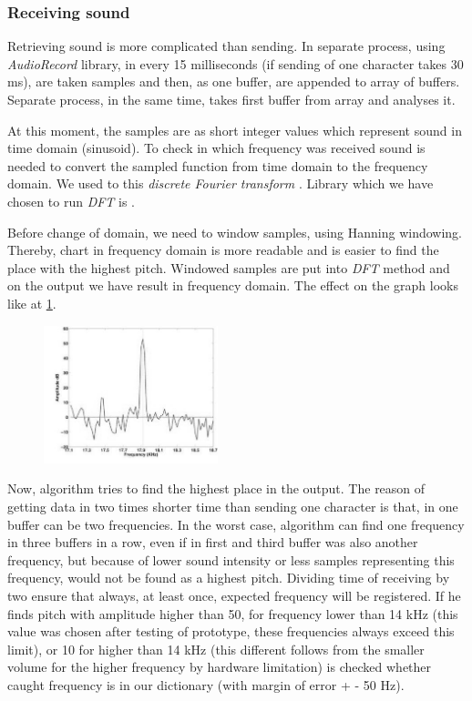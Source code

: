 \documentclass[11pt,titlepage]{article}
\theoremstyle{plain}
\begin{document}
\subsubsection{Receiving sound}

Retrieving sound is more complicated than sending. In separate process, using \textit{AudioRecord} library, in every 15 milliseconds (if sending of one character takes 30 ms), are taken samples and then, as one buffer, are appended to array of buffers. Separate process, in the same time, takes first buffer from array and analyses it. 

\vspace{5mm}

At this moment, the samples are as short integer values which represent sound in time domain (sinusoid). To check in which frequency was received sound is needed to convert the sampled function from time domain to the frequency domain. We used to this \textit{discrete Fourier transform }. Library which we have chosen to run \textit{DFT} is \cite{minim_dft}. 

\vspace{5mm}

Before change of domain, we need to window samples, using Hanning windowing. Thereby, chart in frequency domain is more readable and is easier to find the place with the highest pitch. Windowed samples are put into \textit{DFT} method and on the output we have result in frequency domain. The effect on the graph looks like at \ref{fig:F2}.


\begin{figure}[H]
	\centering
	\includegraphics[width=0.45\textwidth]{img/peaks_1}
	\label{fig:F2}
\end{figure}



Now, algorithm tries to find the highest place in the output. The reason of getting data in two times shorter time than sending one character is that, in one buffer can be two frequencies. In the worst case, algorithm can find one frequency in three buffers in a row, even if in first and third buffer was also another frequency, but because of lower sound intensity or less samples representing this frequency, would not be found as a highest pitch. Dividing time of receiving by two ensure that always, at least once, expected frequency will be registered. If he finds pitch with amplitude higher than 50, for frequency lower than 14 kHz (this value was chosen after testing of prototype, these frequencies always exceed this limit), or 10 for higher than 14 kHz (this different follows from the smaller volume for the higher frequency by hardware limitation) is checked whether caught frequency is in our dictionary (with margin of error + - 50 Hz). 
\end{document}
